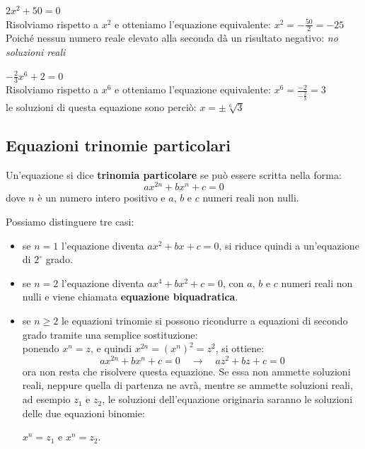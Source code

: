 \begin{esempio}
$2x^2 +50=0$
\\[4pt]
Risolviamo rispetto a $x^2$ e otteniamo l'equazione equivalente: $x^2=-\frac{50}{2}=-25$
\\[4pt]
Poiché nessun numero reale elevato alla seconda dà un risultato 
negativo: \emph{no soluzioni reali}
\end{esempio}    

\begin{esempio}
$-\frac{2}{3}x^6+2=0$
\\[4pt]
Risolviamo rispetto a $x^6$ e otteniamo l'equazione equivalente: \quad 
$x^6=\frac{-2}{-\frac{2}{3}}=3$\\[4pt]
le soluzioni di questa equazione sono perciò: $x=\pm \sqrt[6]{3}$
\end{esempio}

\subsection{Equazioni trinomie particolari}

\begin{definizione}
Un'equazione si dice \textbf{trinomia particolare} se può essere scritta nella 
forma:
$$ax^{2n}+bx^n+c=0$$
dove $n$ è un numero intero positivo e $a$, $b$ e $c$  numeri reali  non 
nulli. 
\end{definizione}

Possiamo distinguere tre casi:
\begin{itemize}
\item se $n=1$ l'equazione diventa $ax^{2}+bx+c=0$, si riduce 
quindi a un'equazione di $2^\circ$ grado.
\item se $n=2$ l'equazione diventa $ax^{4}+bx^2+c=0$, con $a$, 
$b$ e $c$ numeri reali  non nulli e viene chiamata \textbf{equazione 
biquadratica}.
\item se $n\geq 2$ le equazioni trinomie si possono ricondurre a 
equazioni di secondo grado tramite una semplice sostituzione:\\[4pt]
ponendo $x^n=z$, e quindi $x^{2n}=(x^n)^2=z^2$, si ottiene:
$$ax^{2n}+bx^n+c=0 \quad \longrightarrow \quad az^{2}+bz+c=0$$
ora non resta che risolvere questa equazione. Se essa non ammette  
soluzioni reali, neppure quella di partenza ne avrà, mentre se ammette soluzioni reali, ad esempio $z_1$ e $z_2$, le soluzioni 
dell'equazione originaria saranno le soluzioni delle due equazioni 
binomie:
\begin{center}
  $x^n=z_1$ e $x^n=z_2$.
\end{center}
\end{itemize}


